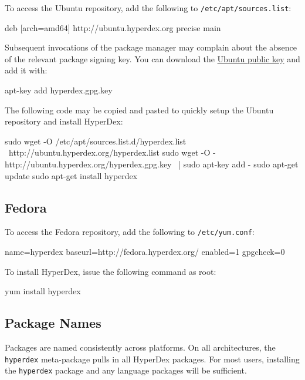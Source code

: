 To access the Ubuntu repository, add the following to
\texttt{/etc/apt/sources.list}:

\begin{consolecode}
deb [arch=amd64] http://ubuntu.hyperdex.org precise main
\end{consolecode}

Subsequent invocations of the package manager may complain about the absence of
the relevant package signing key.  You can download the
\href{http://ubuntu.hyperdex.org/hyperdex.gpg.key}{Ubuntu public key} and add
it with:

\begin{consolecode}
apt-key add hyperdex.gpg.key
\end{consolecode}

The following code may be copied and pasted to quickly setup the Ubuntu
repository and install HyperDex:

\begin{consolecode}
sudo wget -O /etc/apt/sources.list.d/hyperdex.list \
    http://ubuntu.hyperdex.org/hyperdex.list
sudo wget -O - http://ubuntu.hyperdex.org/hyperdex.gpg.key \
| sudo apt-key add -
sudo apt-get update
sudo apt-get install hyperdex
\end{consolecode}

\subsection{Fedora}

To access the Fedora repository, add the following to \texttt{/etc/yum.conf}:

\begin{consolecode}
[hyperdex]
name=hyperdex
baseurl=http://fedora.hyperdex.org/
enabled=1
gpgcheck=0
\end{consolecode}

To install HyperDex, issue the following command as root:

\begin{consolecode}
yum install hyperdex
\end{consolecode}

\subsection{Package Names}

Packages are named consistently across platforms.  On all architectures, the
\texttt{hyperdex} meta-package pulls in all HyperDex packages.  For most users,
installing the \texttt{hyperdex} package and any language packages will be
sufficient.

